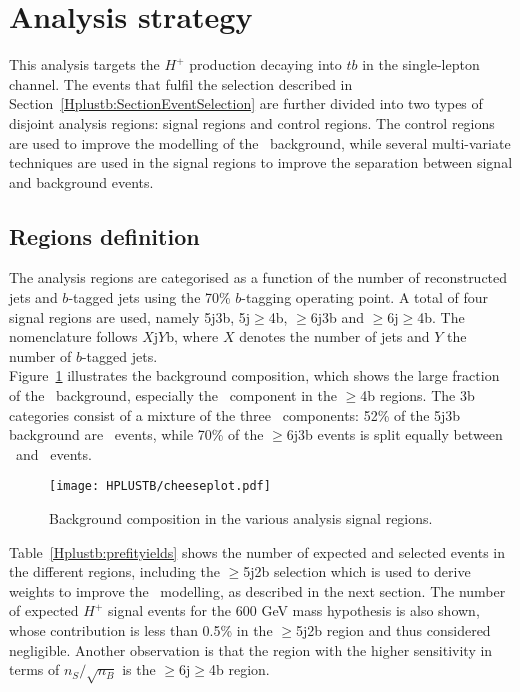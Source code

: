 \section{Analysis strategy}
This analysis targets the $H^+$ production decaying into $tb$ in the single-lepton channel. The events that fulfil the selection described in Section~\ref{Hplustb:SectionEventSelection} are further divided into two types of disjoint analysis regions: signal regions and control regions. The control regions are used to improve the modelling of the \ttjets\ background, while several multi-variate techniques are used in the signal regions to improve the separation between signal and background events.

\subsection{Regions definition}

The analysis regions are categorised as a function of the number of reconstructed jets and $b$-tagged jets using the 70\% $b$-tagging operating point. A total of four signal regions are used, namely 5j3b, 5j$\geq$4b, $\geq$6j3b and $\geq$6j$\geq$4b. The nomenclature follows $X$j$Y$b, where $X$ denotes the number of jets and $Y$ the number of $b$-tagged jets.\\

Figure~\ref{Hplustb:cheeseplots} illustrates the background composition, which shows the large fraction of the \ttbar\ background, especially the \ttb\ component in the $\geq$4b regions. The 3b categories consist of a mixture of the three \ttbar\ components: 52\% of the 5j3b background are \ttl\ events, while 70\% of the $\geq$6j3b events is split equally between \ttb\ and \ttl\ events.\\

\begin{figure}[htbp]
    \RawFloats
    \begin{center}
    \texttt{[image: HPLUSTB/cheeseplot.pdf]}
    \caption{
        Background composition in the various analysis signal regions.
    }
    \label{Hplustb:cheeseplots}
    \end{center}
\end{figure}

Table~\ref{Hplustb:prefityields} shows the number of expected and selected events in the different regions, including the $\geq$5j2b selection which is used to derive weights to improve the \ttbar\ modelling, as described in the next section. The number of expected $H^+$ signal events for the 600 GeV mass hypothesis is also shown, whose contribution is less than 0.5\% in the $\geq$5j2b region and thus considered negligible. Another observation is that the region with the higher sensitivity in terms of $n_S/\sqrt{n_B}$ is the $\geq$6j$\geq$4b region.\\  %

